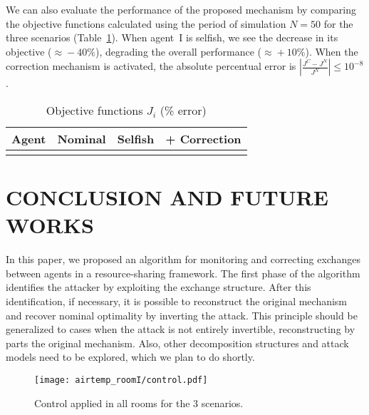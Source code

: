 \documentclass{ifacconf}  %
\begin{document}
We can also evaluate the performance of the proposed mechanism by comparing the objective functions calculated using the period of simulation ${N=50}$ for the three scenarios (Table~\ref{tab:costsGlobalLocal}).
When agent~I is selfish, we see the decrease in its objective ($\approx\!-40\%$), degrading the overall performance ($\approx\!+10\%$).
When the correction mechanism is activated, the absolute percentual error is ${|\frac{J^{C}-J^{N}}{J^{N}}|\leq10^{-8}}$.
\begin{table}[h]
  \centering
  \caption{Objective functions $J_{i}$ (\% error)}\label{tab:costsGlobalLocal}
  \begin{tabular}[t]{cccc}
    \toprule
    Agent  & Nominal & Selfish & + Correction\\
    \midrule
    \\
    \bottomrule
  \end{tabular}
\end{table}

\section{CONCLUSION AND FUTURE WORKS}\label{sec:CC}
In this paper, we proposed an algorithm for monitoring and correcting exchanges between agents in a resource-sharing framework.
The first phase of the algorithm identifies the attacker by exploiting the exchange structure.
After this identification, if necessary, it is possible to reconstruct the original mechanism and recover nominal optimality by inverting the attack.
This principle should be generalized to cases when the attack is not entirely invertible, reconstructing by parts the original mechanism.
Also, other decomposition structures and attack models need to be explored, which we plan to do shortly.

\begin{figure}[h]
  \centering
 \texttt{[image: airtemp\_roomI/control.pdf]}
  \caption{Control applied in all rooms for the 3 scenarios.}\label{fig:control_3Scenarios}
\end{figure}


% 
\end{document}
